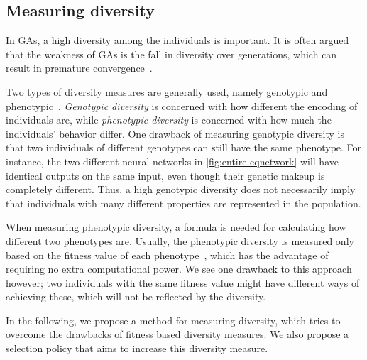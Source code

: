 \subsection{Measuring diversity}
In GAs, a high diversity among the individuals is important. It is often argued that the weakness of GAs is the fall in diversity over generations, which can result in premature convergence~\cite{diaz2007empirical, 1266373,Zitzler00comparisonof}.

Two types of diversity measures are generally used, namely genotypic and phenotypic~\cite{Nguyen:2006:ASPGP,1250187}. \emph{Genotypic diversity} is concerned with how different the encoding of individuals are, while \emph{phenotypic diversity} is concerned with how much the individuals' behavior differ. One drawback of measuring genotypic diversity is that two individuals of different genotypes can still have the same phenotype. For instance, the two different neural networks in \cref{fig:entire-eqnetwork} will have identical outputs on the same input, even though their genetic makeup is completely different. Thus, a high genotypic diversity does not necessarily imply that individuals with many different properties are represented in the population.
%

%
When measuring phenotypic diversity, a formula is needed for calculating how different two phenotypes are. Usually, the phenotypic diversity is measured only based on the fitness value of each phenotype~\cite{Nguyen:2006:ASPGP}, which has the advantage of requiring no extra computational power.  We see one drawback to this approach however; two individuals with the same fitness value might have different ways of achieving these, which will not be reflected by the diversity.

In the following, we propose a method for measuring diversity, which tries to overcome the drawbacks of fitness based diversity measures. We also propose a selection policy that aims to increase this diversity measure.
